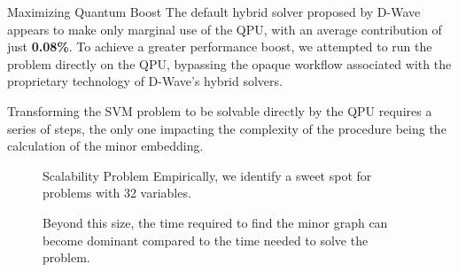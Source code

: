 \documentclass[final]{beamer}
\newlength{\colwidth}
\begin{document}
\begin{frame}[t,fragile]
\begin{columns}[t]
\begin{column}{\colwidth}
  \begin{block}{Maximizing Quantum Boost} 
    The default hybrid solver proposed by D-Wave appears to make only marginal use of the QPU, with an average contribution of just \textbf{0.08\%}. 
    To achieve a greater performance boost, we attempted to run the problem directly on the QPU, bypassing the opaque workflow associated with the proprietary technology of D-Wave’s hybrid solvers.

    Transforming the SVM problem to be solvable directly by the QPU requires a series of steps, the only one impacting the complexity of the procedure being the calculation of the minor embedding\cite{MEdwave}.

    \begin{figure}[h!]
      \centering
      \begin{minipage}{0.55\textwidth}
        \begin{alertblock}{Scalability Problem}
          Empirically, we identify a sweet spot for problems with 32 variables.
          
          Beyond this size, the time required to find the minor graph can become dominant compared to the time needed to solve the problem.


\end{alertblock}
\end{minipage}
\end{figure}
\end{block}
\end{column}
\end{columns}
\end{frame}
\end{document}
